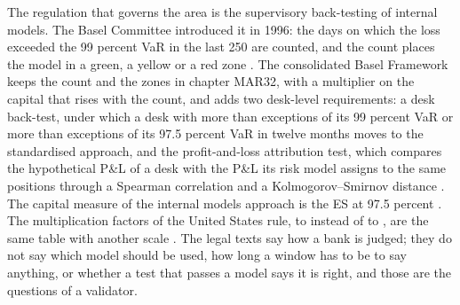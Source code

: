 The regulation that governs the area is the supervisory back-testing of internal models. The Basel Committee introduced it in 1996:
the days on which the loss exceeded the 99 percent VaR in the last 250 are counted, and the count places the model in a green, a yellow
or a red zone \citep{market:bcbs1996}. The consolidated Basel Framework keeps the count and the zones in chapter MAR32, with a
multiplier on the capital that rises with the count, and adds two desk-level requirements: a desk back-test, under which a desk with
more than \mkDeskLimitNN{} exceptions of its 99 percent VaR or more than \mkDeskLimitNF{} exceptions of its 97.5 percent VaR in twelve
months moves to the standardised approach, and the profit-and-loss attribution test, which compares the hypothetical P\&L of a desk with the
P\&L its risk model assigns to the same positions through a Spearman correlation and a Kolmogorov--Smirnov distance
\citep{market:bcbsmar32}. The capital measure of the internal models approach is the ES at 97.5 percent \citep{market:bcbsmar33}. The
multiplication factors of the United States rule, \mkTlFourUs{} to \mkTlTenUs{} instead of \mkTlFourMult{} to \mkTlTenMult{}, are the same table
with another scale \citep{market:cfr217204}. The legal texts say how a bank is judged; they do not say which model should be used, how long a window
has to be to say anything, or whether a test that passes a model says it is right, and those are the questions of a validator.

